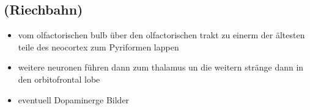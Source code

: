 \documentclass[12pt,a4paper,pdftex]{article}
\begin{document}

\subsection{(Riechbahn)}
\begin{itemize}
    \item vom olfactorischen bulb über den olfactorischen trakt zu einerm der ältesten teile des neocortex zum Pyriformen lappen
    \item weitere neuronen führen dann zum thalamus un die weitern stränge dann in den orbitofrontal lobe \cite{smith2008biology} 
    \item eventuell Dopaminerge Bilder
\end{itemize}


\newpage



\printindex
\end{document}
